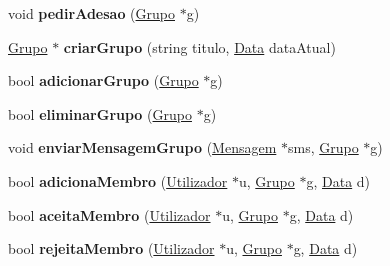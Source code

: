 \begin{DoxyCompactItemize}
\item 
\hypertarget{class_utilizador_aba7f8c8306ae34617d5af06678a8cd12}{}void {\bfseries pedir\+Adesao} (\hyperlink{class_grupo}{Grupo} $\ast$g)\label{class_utilizador_aba7f8c8306ae34617d5af06678a8cd12}

\item 
\hypertarget{class_utilizador_a68471f49e5980a4bf43d48b7ce2118a3}{}\hyperlink{class_grupo}{Grupo} $\ast$ {\bfseries criar\+Grupo} (string titulo, \hyperlink{class_data}{Data} data\+Atual)\label{class_utilizador_a68471f49e5980a4bf43d48b7ce2118a3}

\item 
\hypertarget{class_utilizador_abf4ecb088d3ce0512d3225a77a958536}{}bool {\bfseries adicionar\+Grupo} (\hyperlink{class_grupo}{Grupo} $\ast$g)\label{class_utilizador_abf4ecb088d3ce0512d3225a77a958536}

\item 
\hypertarget{class_utilizador_a488989600af5553e7377812fdd611fe6}{}bool {\bfseries eliminar\+Grupo} (\hyperlink{class_grupo}{Grupo} $\ast$g)\label{class_utilizador_a488989600af5553e7377812fdd611fe6}

\item 
\hypertarget{class_utilizador_af58be0db512c246659d4fc5210bdc081}{}void {\bfseries enviar\+Mensagem\+Grupo} (\hyperlink{class_mensagem}{Mensagem} $\ast$sms, \hyperlink{class_grupo}{Grupo} $\ast$g)\label{class_utilizador_af58be0db512c246659d4fc5210bdc081}

\item 
\hypertarget{class_utilizador_a355f9a633b971d28a926cfcb3a20f8a7}{}bool {\bfseries adiciona\+Membro} (\hyperlink{class_utilizador}{Utilizador} $\ast$u, \hyperlink{class_grupo}{Grupo} $\ast$g, \hyperlink{class_data}{Data} d)\label{class_utilizador_a355f9a633b971d28a926cfcb3a20f8a7}

\item 
\hypertarget{class_utilizador_a0f6e7e02554b5d9cadc81c0f089f4a76}{}bool {\bfseries aceita\+Membro} (\hyperlink{class_utilizador}{Utilizador} $\ast$u, \hyperlink{class_grupo}{Grupo} $\ast$g, \hyperlink{class_data}{Data} d)\label{class_utilizador_a0f6e7e02554b5d9cadc81c0f089f4a76}

\item 
\hypertarget{class_utilizador_aa31a2ff79c063bce4c810eaae801bdd5}{}bool {\bfseries rejeita\+Membro} (\hyperlink{class_utilizador}{Utilizador} $\ast$u, \hyperlink{class_grupo}{Grupo} $\ast$g, \hyperlink{class_data}{Data} d)\label{class_utilizador_aa31a2ff79c063bce4c810eaae801bdd5}


\end{DoxyCompactItemize}
